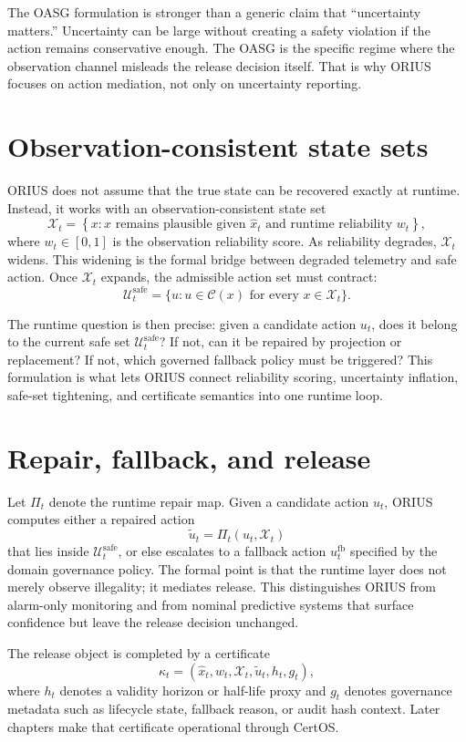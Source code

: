 The OASG formulation is stronger than a generic claim that ``uncertainty matters.'' Uncertainty
can be large without creating a safety violation if the action remains conservative enough. The
OASG is the specific regime where the observation channel misleads the release decision itself.
That is why ORIUS focuses on action mediation, not only on uncertainty reporting.

\section{Observation-consistent state sets}
ORIUS does not assume that the true state can be recovered exactly at runtime. Instead, it works
with an observation-consistent state set
\[
\mathcal{X}_t = \left\{x : x \text{ remains plausible given } \hat{x}_t \text{ and runtime reliability } w_t\right\},
\]
where $w_t \in [0,1]$ is the observation reliability score. As reliability degrades,
$\mathcal{X}_t$ widens. This widening is the formal bridge between degraded telemetry and safe
action. Once $\mathcal{X}_t$ expands, the admissible action set must contract:
\[
\mathcal{U}_t^{\mathrm{safe}} = \{u : u \in \mathcal{C}(x) \text{ for every } x \in \mathcal{X}_t\}.
\]

The runtime question is then precise: given a candidate action $u_t$, does it belong to the
current safe set $\mathcal{U}_t^{\mathrm{safe}}$? If not, can it be repaired by projection or
replacement? If not, which governed fallback policy must be triggered? This formulation is what
lets ORIUS connect reliability scoring, uncertainty inflation, safe-set tightening, and
certificate semantics into one runtime loop.

\section{Repair, fallback, and release}
Let $\Pi_t$ denote the runtime repair map. Given a candidate action $u_t$, ORIUS computes either
a repaired action
\[
\tilde{u}_t = \Pi_t(u_t,\mathcal{X}_t)
\]
that lies inside $\mathcal{U}_t^{\mathrm{safe}}$, or else escalates to a fallback action
$u_t^{\mathrm{fb}}$ specified by the domain governance policy. The formal point is that the
runtime layer does not merely observe illegality; it mediates release. This distinguishes ORIUS
from alarm-only monitoring and from nominal predictive systems that surface confidence but leave
the release decision unchanged.

The release object is completed by a certificate
\[
\kappa_t = (\hat{x}_t, w_t, \mathcal{X}_t, \tilde{u}_t, h_t, g_t),
\]
where $h_t$ denotes a validity horizon or half-life proxy and $g_t$ denotes governance metadata
such as lifecycle state, fallback reason, or audit hash context. Later chapters make that
certificate operational through CertOS.

